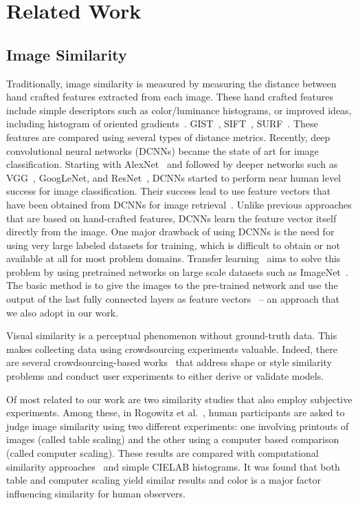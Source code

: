 \chapter{Related Work}
\label{chp:b2}

\section{Image Similarity}
Traditionally, image similarity is measured by measuring the distance between hand crafted features extracted from each image. These hand crafted features include simple descriptors such as color/luminance histograms, or improved ideas, including histogram of oriented gradients~\cite{dalal2005histograms}. GIST~\cite{oliva2001modeling}, SIFT~\cite{lowe2004distinctive}, SURF~\cite{bay2006surf}. These features are compared using several types of distance metrics. Recently, deep convolutional neural networks (DCNNs) became the state of art for image classification. Starting with AlexNet~\cite{krizhevsky2012imagenet} and followed by deeper networks such as VGG~\cite{simonyan2014very}, GoogLeNet\cite{szegedy2015going}, and ResNet~\cite{he2016deep}, DCNNs started to perform near human level success for image classification. Their success lead to use feature vectors that have been obtained from DCNNs for image retrieval~\cite{wan2014deep,gordo2016deep}. Unlike previous approaches that are based on hand-crafted features, DCNNs learn the feature vector itself directly from the image. One major drawback of using
DCNNs is the need for using very large labeled datasets for training, which is difficult to obtain or not available at all for most problem domains. Transfer learning~\cite{yosinski2014transferable} aims to solve this problem by using pretrained networks on large scale datasets such as ImageNet~\cite{russakovsky2015imagenet}. The basic method is to give the images to the pre-trained network and use the output of the last fully connected layers as feature vectors~\cite{donahue2014decaf,wan2014deep} -- an approach that we also adopt in our work.

Visual similarity is a perceptual phenomenon without ground-truth data. This makes collecting data using crowdsourcing experiments valuable. Indeed, there are several crowdsourcing-based works~\cite{lun2015elements,saleh2015learning,kleiman2016toward} that address shape or style similarity problems and conduct user experiments to either derive or validate models.

Of most related to our work are two similarity studies that also employ subjective experiments. Among these, in Rogowitz et al.~\cite{rogowitz1998perceptual}, human participants are asked to judge image similarity using two different experiments: one involving printouts of images (called table scaling) and the other using a computer based comparison (called computer scaling). These results are compared with computational similarity approaches~\cite{frese1997methodology} and simple CIELAB histograms. It was found that both table and computer scaling yield similar results and color is a major factor influencing similarity for human observers.

